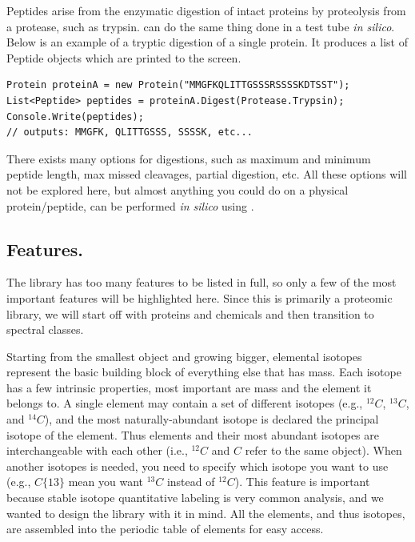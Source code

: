 Peptides arise from the enzymatic digestion of intact proteins by proteolysis from a protease, such as trypsin. \csmsl{} can do the same thing done in a test tube \emph{in silico}. Below is an example of a tryptic digestion of a single protein. It produces a list of Peptide objects which are printed to the screen.

\begin{lstlisting}
Protein proteinA = new Protein("MMGFKQLITTGSSSRSSSSKDTSST");
List<Peptide> peptides = proteinA.Digest(Protease.Trypsin);
Console.Write(peptides);
// outputs: MMGFK, QLITTGSSS, SSSSK, etc...
\end{lstlisting}

There exists many options for digestions, such as maximum and minimum peptide length, max missed cleavages, partial digestion, etc. All these options will not be explored here, but almost anything you could do on a physical protein/peptide, can be performed \emph{in silico} using \csmsl{}.

\subsection*{Features.}
The \csmsl{} library has too many features to be listed in full, so only a few of the most important features will be highlighted here. Since this is primarily a proteomic library, we will start off with proteins and chemicals and then transition to spectral classes. 

Starting from the smallest object and growing bigger, elemental isotopes represent the basic building block of everything else that has mass. Each isotope has a few intrinsic properties, most important are mass and the element it belongs to. A single element may contain a set of different isotopes (e.g., $^{12}C$, $^{13}C$, and $^{14}C$), and the most naturally-abundant isotope is declared the principal isotope of the element. Thus elements and their most abundant isotopes are interchangeable with each other (i.e., $^{12}C$ and $C$ refer to the same object). When another isotopes is needed, you need to specify which isotope you want to use (e.g., $C\{13\}$ mean you want $^{13}C$ instead of $^{12}C$). This feature is important because stable isotope quantitative labeling is very common analysis, and we wanted to design the library with it in mind. All the elements, and thus isotopes, are assembled into the periodic table of elements for easy access.


